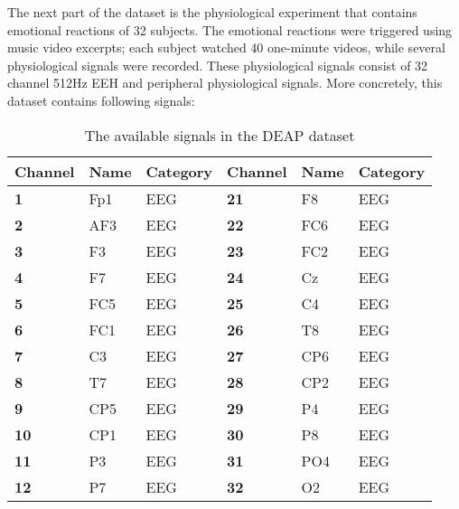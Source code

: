 The next part of the dataset is the physiological experiment that contains emotional reactions of 32 subjects. The emotional reactions were triggered using music video excerpts; each subject watched 40 one-minute videos, while several physiological signals were recorded. These physiological signals consist of 32 channel 512Hz EEH and peripheral physiological signals. More concretely, this dataset contains following signals:
\begin{table}[]
\centering
\caption{The available signals in the DEAP dataset}
\label{DEAPSignals}
\begin{tabular}{l|ll|l|ll}
\textbf{Channel} & \textbf{Name} & \textbf{Category} & \textbf{Channel} & \textbf{Name}    & \textbf{Category} \\ \hline
\textbf{1}       & Fp1           & EEG               & \textbf{21}      & F8               & EEG               \\
\textbf{2}       & AF3           & EEG               & \textbf{22}      & FC6              & EEG               \\
\textbf{3}       & F3            & EEG               & \textbf{23}      & FC2              & EEG               \\
\textbf{4}       & F7            & EEG               & \textbf{24}      & Cz               & EEG               \\
\textbf{5}       & FC5           & EEG               & \textbf{25}      & C4               & EEG               \\
\textbf{6}       & FC1           & EEG               & \textbf{26}      & T8               & EEG               \\
\textbf{7}       & C3            & EEG               & \textbf{27}      & CP6              & EEG               \\
\textbf{8}       & T7            & EEG               & \textbf{28}      & CP2              & EEG               \\
\textbf{9}       & CP5           & EEG               & \textbf{29}      & P4               & EEG               \\
\textbf{10}      & CP1           & EEG               & \textbf{30}      & P8               & EEG               \\
\textbf{11}      & P3            & EEG               & \textbf{31}      & PO4              & EEG               \\
\textbf{12}      & P7            & EEG               & \textbf{32}      & O2               & EEG               \\

\end{tabular}
\end{table}
